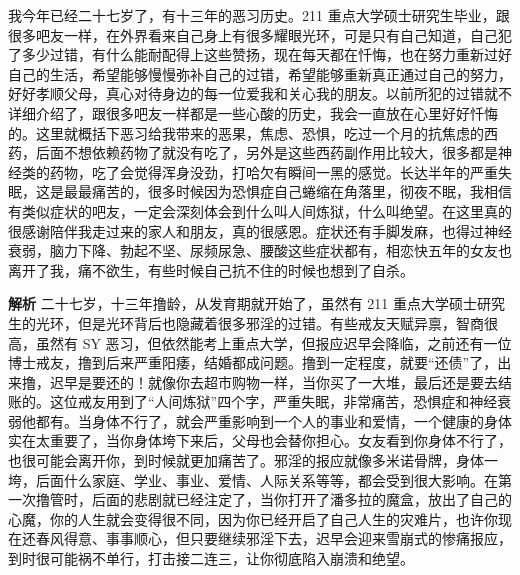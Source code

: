 \begin{case}[神经衰弱]
    我今年已经二十七岁了，有十三年的恶习历史。211 重点大学硕士研究生毕业，跟很多吧友一样，在外界看来自己身上有很多耀眼光环，可是只有自己知道，自己犯了多少过错，有什么能耐配得上这些赞扬，现在每天都在忏悔，也在努力重新过好自己的生活，希望能够慢慢弥补自己的过错，希望能够重新真正通过自己的努力，好好孝顺父母，真心对待身边的每一位爱我和关心我的朋友。以前所犯的过错就不详细介绍了，跟很多吧友一样都是一些心酸的历史，我会一直放在心里好好忏悔的。这里就概括下恶习给我带来的恶果，焦虑、恐惧，吃过一个月的抗焦虑的西药，后面不想依赖药物了就没有吃了，另外是这些西药副作用比较大，很多都是神经类的药物，吃了会觉得浑身没劲，打哈欠有瞬间一黑的感觉。长达半年的严重失眠，这是最最痛苦的，很多时候因为恐惧症自己蜷缩在角落里，彻夜不眠，我相信有类似症状的吧友，一定会深刻体会到什么叫人间炼狱，什么叫绝望。在这里真的很感谢陪伴我走过来的家人和朋友，真的很感恩。症状还有手脚发麻，也得过神经衰弱，脑力下降、勃起不坚、尿频尿急、腰酸这些症状都有，相恋快五年的女友也离开了我，痛不欲生，有些时候自己抗不住的时候也想到了自杀。

    \textbf{解析} 二十七岁，十三年撸龄，从发育期就开始了，虽然有 211 重点大学硕士研究生的光环，但是光环背后也隐藏着很多邪淫的过错。有些戒友天赋异禀，智商很高，虽然有 SY 恶习，但依然能考上重点大学，但报应迟早会降临，之前还有一位博士戒友，撸到后来严重阳痿，结婚都成问题。撸到一定程度，就要“还债”了，出来撸，迟早是要还的！就像你去超市购物一样，当你买了一大堆，最后还是要去结账的。这位戒友用到了“人间炼狱”四个字，严重失眠，非常痛苦，恐惧症和神经衰弱他都有。当身体不行了，就会严重影响到一个人的事业和爱情，一个健康的身体实在太重要了，当你身体垮下来后，父母也会替你担心。女友看到你身体不行了，也很可能会离开你，到时候就更加痛苦了。邪淫的报应就像多米诺骨牌，身体一垮，后面什么家庭、学业、事业、爱情、人际关系等等，都会受到很大影响。在第一次撸管时，后面的悲剧就已经注定了，当你打开了潘多拉的魔盒，放出了自己的心魔，你的人生就会变得很不同，因为你已经开启了自己人生的灾难片，也许你现在还春风得意、事事顺心，但只要继续邪淫下去，迟早会迎来雪崩式的惨痛报应，到时很可能祸不单行，打击接二连三，让你彻底陷入崩溃和绝望。
\end{case}


